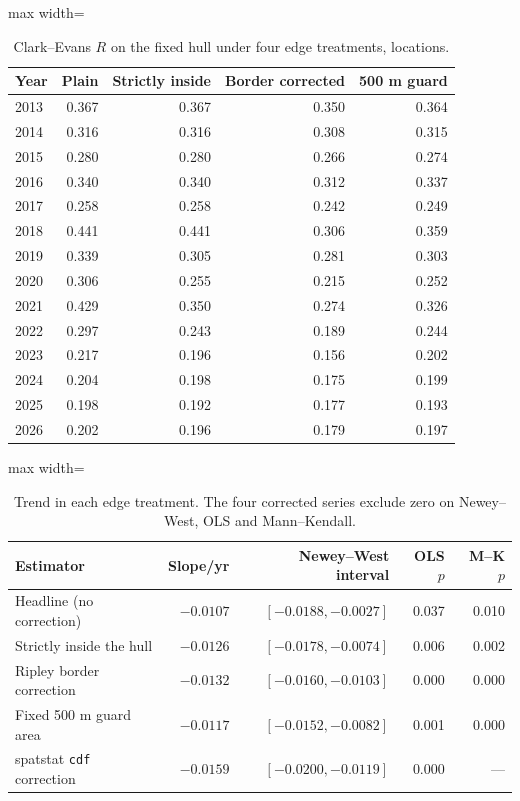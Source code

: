 \documentclass[fleqn,10pt]{wlpeerj}
\begin{document}
\begin{table}[H]
\centering
\caption{Clark--Evans $R$ on the fixed hull under four edge treatments, locations.}
\label{si:edgeest}
\footnotesize
\setlength{\tabcolsep}{4pt}
\begin{adjustbox}{max width=\linewidth}
\begin{tabular}{lrrrr}
\toprule
Year & Plain & Strictly inside & Border corrected & 500 m guard \\
\midrule
2013 & 0.367 & 0.367 & 0.350 & 0.364 \\
2014 & 0.316 & 0.316 & 0.308 & 0.315 \\
2015 & 0.280 & 0.280 & 0.266 & 0.274 \\
2016 & 0.340 & 0.340 & 0.312 & 0.337 \\
2017 & 0.258 & 0.258 & 0.242 & 0.249 \\
2018 & 0.441 & 0.441 & 0.306 & 0.359 \\
2019 & 0.339 & 0.305 & 0.281 & 0.303 \\
2020 & 0.306 & 0.255 & 0.215 & 0.252 \\
2021 & 0.429 & 0.350 & 0.274 & 0.326 \\
2022 & 0.297 & 0.243 & 0.189 & 0.244 \\
2023 & 0.217 & 0.196 & 0.156 & 0.202 \\
2024 & 0.204 & 0.198 & 0.175 & 0.199 \\
2025 & 0.198 & 0.192 & 0.177 & 0.193 \\
2026 & 0.202 & 0.196 & 0.179 & 0.197 \\
\bottomrule
\end{tabular}
\end{adjustbox}
\end{table}

\begin{table}[H]
\centering
\caption{Trend in each edge treatment. The four corrected series exclude zero on Newey--West, OLS and Mann--Kendall.}
\label{si:edgetrend}
\small
\begin{adjustbox}{max width=\linewidth}
\begin{tabular}{lrrrr}
\toprule
Estimator & Slope/yr & Newey--West interval & OLS $p$ & M--K $p$ \\
\midrule
Headline (no correction) & $-0.0107$ & $[-0.0188, -0.0027]$ & 0.037 & 0.010 \\
Strictly inside the hull & $-0.0126$ & $[-0.0178, -0.0074]$ & 0.006 & 0.002 \\
Ripley border correction & $-0.0132$ & $[-0.0160, -0.0103]$ & 0.000 & 0.000 \\
Fixed 500 m guard area & $-0.0117$ & $[-0.0152, -0.0082]$ & 0.001 & 0.000 \\
\textsf{spatstat} \texttt{cdf} correction & $-0.0159$ & $[-0.0200, -0.0119]$ & 0.000 & --- \\
\bottomrule
\end{tabular}
\end{adjustbox}
\end{table}
\end{document}
